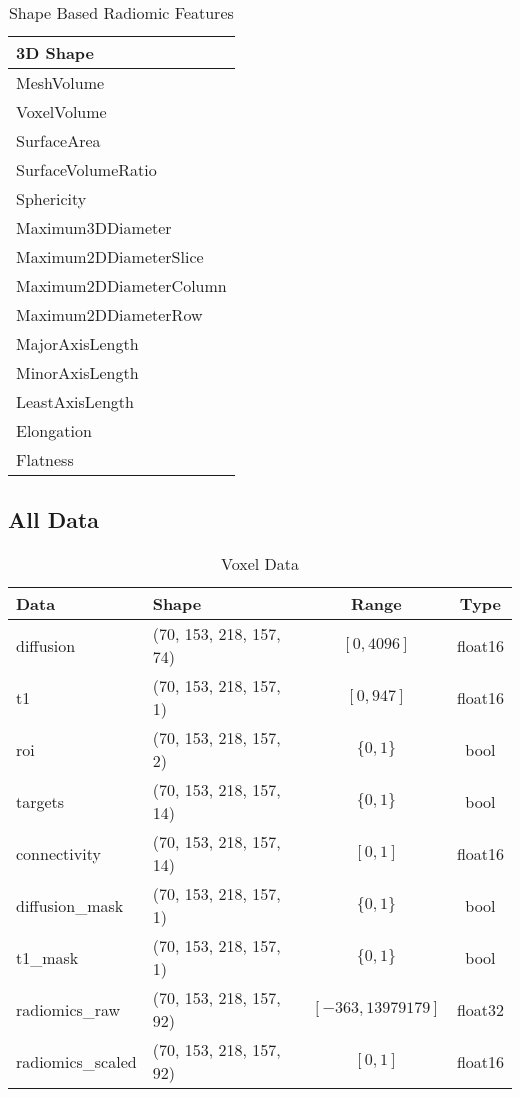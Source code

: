 \begin{table}[H]
\centering
\begin{tabular}{|l|}
\hline
\textbf{3D Shape} \\ \hline
MeshVolume \\ \hline
VoxelVolume \\ \hline
SurfaceArea \\ \hline
SurfaceVolumeRatio \\ \hline
Sphericity \\ \hline
Maximum3DDiameter \\ \hline
Maximum2DDiameterSlice \\ \hline
Maximum2DDiameterColumn \\ \hline
Maximum2DDiameterRow \\ \hline
MajorAxisLength \\ \hline
MinorAxisLength \\ \hline
LeastAxisLength \\ \hline
Elongation \\ \hline
Flatness \\ \hline
\end{tabular}
\caption{Shape Based Radiomic Features}
\label{tab:radf2}
\end{table}

\subsection{All Data}

\begin{table}[H]
\centering
\begin{tabular}{|l|l|c|c|}
\hline
\textbf{Data} & \textbf{Shape} & \textbf{Range} & \textbf{Type} \\ \hline
diffusion & (70, 153, 218, 157, 74) & $[0,4096]$ & float16 \\ \hline
t1 & (70, 153, 218, 157, 1) & $[0,947]$ & float16 \\ \hline
roi & (70, 153, 218, 157, 2) & $\{0,1\}$ & bool \\ \hline
targets & (70, 153, 218, 157, 14) & $\{0,1\}$ & bool \\ \hline
connectivity & (70, 153, 218, 157, 14) & $[0,1]$ & float16 \\ \hline
diffusion\_mask & (70, 153, 218, 157, 1) & $\{0,1\}$ & bool \\ \hline
t1\_mask & (70, 153, 218, 157, 1) & $\{0,1\}$ & bool \\ \hline
radiomics\_raw & (70, 153, 218, 157, 92) & $[-363,13979179]$ & float32 \\ \hline
radiomics\_scaled & (70, 153, 218, 157, 92) & $[0,1]$ & float16 \\ \hline
\end{tabular}
\caption{Voxel Data}
\label{tab:datasvox}
\end{table}

